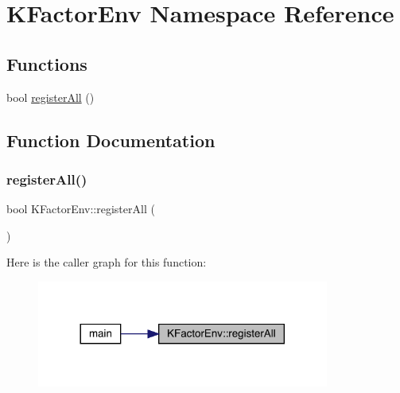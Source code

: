\hypertarget{namespaceKFactorEnv}{}\section{K\+Factor\+Env Namespace Reference}
\label{namespaceKFactorEnv}
\subsection*{Functions}
\begin{DoxyCompactItemize}
\item 
bool \mbox{\hyperlink{namespaceKFactorEnv_a458bafc912e851a27c825155215c5083}{register\+All}} ()
\end{DoxyCompactItemize}


\subsection{Function Documentation}
\mbox{\label{namespaceKFactorEnv_a458bafc912e851a27c825155215c5083}} 
\subsubsection{\texorpdfstring{registerAll()}{registerAll()}}
{\footnotesize\ttfamily bool K\+Factor\+Env\+::register\+All (\begin{DoxyParamCaption}{ }\end{DoxyParamCaption})}

Here is the caller graph for this function\+:
\nopagebreak
\begin{figure}[H]
\begin{center}
\leavevmode
\includegraphics[width=272pt]{d2/d90/namespaceKFactorEnv_a458bafc912e851a27c825155215c5083_icgraph}
\end{center}
\end{figure}

